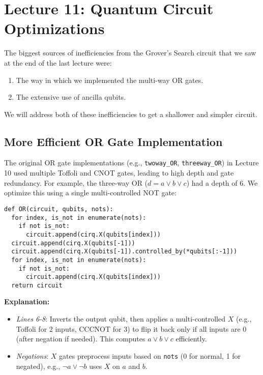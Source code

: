 \section{Lecture 11: Quantum Circuit Optimizations}\label{sec:lecture11}

The biggest sources of inefficiencies from the Grover's Search circuit that
we saw at the end of the last lecture were:

\begin{enumerate}
  \item The way in which we implemented the multi-way OR gates.

  \item The extensive use of ancilla qubits.
\end{enumerate}

\vspace{0.3cm}

\noindent
We will address both of these inefficiencies to get a shallower and simpler
circuit.

\subsection*{More Efficient OR Gate Implementation}

The original OR gate implementations (e.g., \texttt{twoway\_OR},
\texttt{threeway\_OR}) in Lecture 10 used multiple Toffoli and CNOT gates,
leading to high depth and gate redundancy. For example, the three-way OR ($d
= a \lor b \lor c$) had a depth of 6. We optimize this using a single
multi-controlled NOT gate:

\begin{verbatim}
def OR(circuit, qubits, nots):
  for index, is_not in enumerate(nots):
    if not is_not:
      circuit.append(cirq.X(qubits[index]))
  circuit.append(cirq.X(qubits[-1]))
  circuit.append(cirq.X(qubits[-1]).controlled_by(*qubits[:-1]))
  for index, is_not in enumerate(nots):
    if not is_not:
      circuit.append(cirq.X(qubits[index]))
  return circuit
\end{verbatim}

\textbf{Explanation:}
\begin{itemize}
  \item \textit{Lines 6-8}: Inverts the output qubit, then applies a
    multi-controlled $X$ (e.g., Toffoli for 2 inputs, CCCNOT for 3) to flip
    it back only if all inputs are 0 (after negation if needed). This
    computes $a \lor b \lor c$ efficiently.

  \item \textit{Negations}: $X$ gates preprocess inputs based on
    \texttt{nots} (0 for normal, 1 for negated), e.g., $\neg a \lor \neg b$
    uses $X$ on $a$ and $b$.
\end{itemize}

